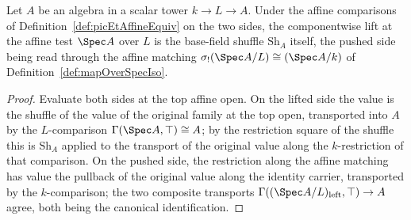 \begin{theorem}
  \label{thm:picEtAffineEquiv_picEtCrossBase}
  \leanok
  Let \(A\) be an algebra in a scalar tower \(k \to L \to A\).  Under the affine
  comparisons of Definition~\ref{def:picEtAffineEquiv} on the two sides, the
  componentwise lift at the affine test \(\Spec A\) over \(L\) is the base-field
  shuffle \(\mathrm{Sh}_A\) itself, the pushed side being read through the affine
  matching \(\sigma_{!}(\Spec A / L) \cong (\Spec A / k)\) of
  Definition~\ref{def:mapOverSpecIso}.
\end{theorem}
\begin{proof}
  \leanok
  Evaluate both sides at the top affine open.  On the lifted side the value is the
  shuffle of the value of the original family at the top open, transported into \(A\)
  by the \(L\)-comparison \(\Gamma(\Spec A, \top) \cong A\); by the restriction square
  of the shuffle this is \(\mathrm{Sh}_A\) applied to the transport of the original
  value along the \(k\)-restriction of that comparison.  On the pushed side, the
  restriction along the affine matching has value the pullback of the original value
  along the identity carrier, transported by the \(k\)-comparison; the two composite
  transports \(\Gamma((\Spec A/L)_{\mathrm{left}}, \top) \to A\) agree, both being the
  canonical identification.
\end{proof}

